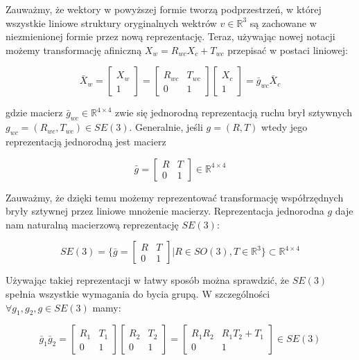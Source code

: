 \documentclass[a4paper,12pt]{article}
\newcommand{\RR}{\mathbb{R}^3}
\newcommand{\RRRq}{\mathbb{R}^{4 \times 4}}
\begin{document}

Zauważmy, że wektory w powyższej formie tworzą podprzestrzeń, w której wszystkie liniowe struktury oryginalnych wektrów $v \in \RR$ są zachowane w niezmienionej formie przez nową reprezentację. Teraz, używając nowej notacji możemy transformację afiniczną $X_w = R_{wc}X_c+ T_{wc}$ przepisać w postaci liniowej:

\begin{equation}
\bar{X}_w = \begin{bmatrix} X_w \\ 1 \end{bmatrix} = \begin{bmatrix} R_{wc} & T_{wc} \\ 0 & 1 \end{bmatrix}\begin{bmatrix} X_c \\ 1 \end{bmatrix} = \bar{g}_{wc}\bar{X}_c
\end{equation}

gdzie macierz $\bar{g}_{wc} \in \RRRq$ zwie się jednorodną reprezentacją ruchu brył sztywnych $g_{wc} = (R_{wc}, T_{wc}) \in SE(3)$. Generalnie, jeśli $g = (R,T)$ wtedy jego reprezentacją jednorodną jest macierz 

\begin{equation}
\bar{g} = \begin{bmatrix} R & T \\ 0 & 1 \end{bmatrix} \in \RRRq
\end{equation}

Zauważmy, że dzięki temu możemy reprezentować transformację współrzędnych bryły sztywnej przez liniowe mnożenie macierzy. Reprezentacja jednorodna $g$ daje nam naturalną macierzową reprezentację $SE(3)$:

\begin{equation}
SE(3) = \{ \bar{g} = \begin{bmatrix} R & T \\ 0 & 1 \end{bmatrix} | R \in SO(3), T \in \RR \} \subset \RRRq
\end{equation}

Używając takiej reprezentacji w łatwy sposób można sprawdzić, że $SE(3)$ spełnia wszystkie wymagania do bycia grupą. W szczególności $\forall g_1,g_2,g \in SE(3)$ mamy:

\begin{equation}
\bar{g}_1\bar{g}_2 = \begin{bmatrix} R_1 & T_1 \\ 0 & 1 \end{bmatrix}\begin{bmatrix} R_2 & T_2 \\ 0 & 1 \end{bmatrix}=\begin{bmatrix} R_1R_2 & R_1T_2+T_1 \\ 0 & 1 \end{bmatrix} \in SE(3)
\end{equation}
\end{document}
